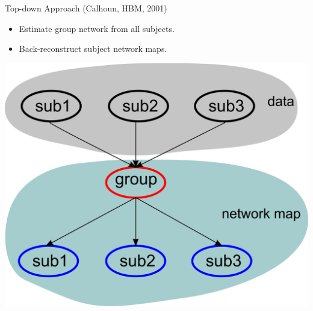 \documentclass[serif]{beamer}
\begin{document}
\begin{frame}
\begin{columns}[t]
  \begin{column}{5.5cm}
    \begin{block}{Top-down Approach (Calhoun, HBM, 2001)}
      \begin{itemize}
        \item Estimate group network from all subjects.
        \item Back-reconstruct  subject network maps.
      \end{itemize}
    \end{block}
    \includegraphics[width=\textwidth]{sfig/hier2}
  \end{column}
\end{columns}
\end{frame}
\end{document}
